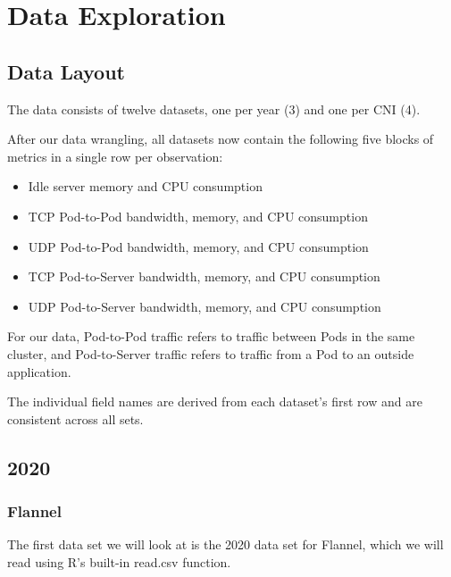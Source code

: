%
%

\pagebreak
\section{Data Exploration}

\onehalfspacing

\subsection{Data Layout}

The data consists of twelve datasets, one per year (3) and one per CNI (4).

After our data wrangling, all datasets now contain the following five blocks of metrics in a single row per observation:

\begin{itemize}
    \item Idle server memory and CPU consumption
    \item TCP Pod-to-Pod bandwidth, memory, and CPU consumption
    \item UDP Pod-to-Pod bandwidth, memory, and CPU consumption
    \item TCP Pod-to-Server bandwidth, memory, and CPU consumption
    \item UDP Pod-to-Server bandwidth, memory, and CPU consumption
\end{itemize}

For our data, Pod-to-Pod traffic refers to traffic between Pods in the same cluster, and Pod-to-Server traffic refers to traffic from a Pod to an outside application.

The individual field names are derived from each dataset's first row and are consistent across all sets.

\subsection{2020}

\subsubsection{Flannel}

The first data set we will look at is the 2020 data set for Flannel,
which we will read using R's built-in read.csv function.

\begin{Shaded}
\begin{Highlighting}[]
\OtherTok{\textless{}{-}} 
\OtherTok{\textless{}{-}} \NormalTok{(}\NormalTok{,}\NormalTok{))}
\end{Highlighting}
\end{Shaded}

